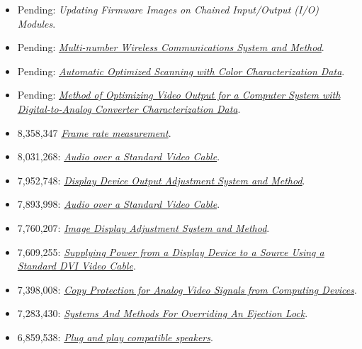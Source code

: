 \documentclass[10pt,letterpaper,oneside]{report}
\begin{document}
\begin{itemize}
  \item Pending:
    {\textit{Updating Firmware Images on Chained Input/Output (I/O) Modules}}.

  \item Pending: \href{http://voltz.ws/resume/20070099638.pdf}
    {\textit{Multi-number Wireless Communications System and Method}}.

  \item Pending: \href{http://voltz.ws/resume/20030123723.pdf}
    {\textit{Automatic Optimized Scanning with Color Characterization Data}}.

  \item Pending: \href{http://voltz.ws/resume/20030122840.pdf}
    {\textit{Method of Optimizing Video Output for a Computer System with
    Digital-to-Analog Converter Characterization Data}}.

  \item 8,358,347 \href{http://voltz.ws/resume/8358347.pdf}
    {\textit{Frame rate measurement}}.

  \item 8,031,268: \href{http://voltz.ws/resume/8031268.pdf}
    {\textit{Audio over a Standard Video Cable}}.

  \item 7,952,748: \href{http://voltz.ws/resume/7952748.pdf}
    {\textit{Display Device Output Adjustment System and Method}}.

  \item 7,893,998: \href{http://voltz.ws/resume/7893998.pdf}
    {\textit{Audio over a Standard Video Cable}}.

  \item 7,760,207: \href{http://voltz.ws/resume/7760207.pdf}
    {\textit{Image Display Adjustment System and Method}}.

  \item 7,609,255: \href{http://voltz.ws/resume/7609255.pdf}
    {\textit{Supplying Power from a Display Device to a Source Using a Standard
    DVI Video Cable}}.

  \item 7,398,008: \href{http://voltz.ws/resume/7398008.pdf}
    {\textit{Copy Protection for Analog Video Signals from Computing Devices}}.

  \item 7,283,430: \href{http://voltz.ws/resume/7283430.pdf}
    {\textit{Systems And Methods For Overriding An Ejection Lock}}.

  \item 6,859,538: \href{http://voltz.ws/resume/6859538.pdf}
    {\textit{Plug and play compatible speakers}}.


\end{itemize}
\end{document}
